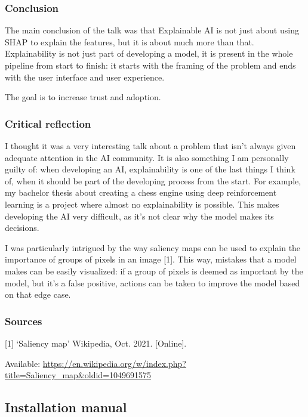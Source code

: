 \documentclass{article}
\begin{document}
\subsubsection{Conclusion}

The main conclusion of the talk was that Explainable AI is not just about using SHAP to explain
the features, but it is about much more than that.
Explainability is not just part of developing a model, 
it is present in the whole pipeline from start to finish: it starts with the framing of the problem
and ends with the user interface and user experience.

The goal is to increase trust and adoption.

\subsubsection{Critical reflection}

I thought it was a very interesting talk about a problem that isn't always given adequate 
attention in the AI community. It is also something I am personally guilty of: when developing
an AI, explainability is one of the last things I think of, when it should be part of the 
developing process from the start. For example, my bachelor thesis about creating a chess engine using deep reinforcement learning
is a project where almost no explainability is possible. This makes developing the AI 
very difficult, as it's not clear why the model makes its decisions. 

I was particularly intrigued by the way saliency maps can be used to explain the importance
of groups of pixels in an image [1]. This way, mistakes that a model makes can be easily visualized:
if a group of pixels is deemed as important by the model, but it's a false positive, actions can 
be taken to improve the model based on that edge case.


\subsubsection{Sources}

[1] `Saliency map' Wikipedia, Oct. 2021. [Online]. 

\hspace{1.5em} Available: \url{https://en.wikipedia.org/w/index.php?title=Saliency\_map\&oldid=1049691575}

\newpage
\subsection{Installation manual}
\end{document}
